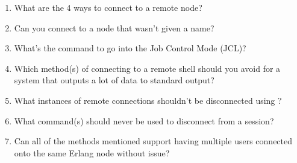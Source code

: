 \begin{enumerate}
	\item What are the 4 ways to connect to a remote node?
	\item Can you connect to a node that wasn't given a name?
	\item What's the command to go into the Job Control Mode (JCL)?
	\item Which method(s) of connecting to a remote shell should you avoid for a system that outputs a lot of data to standard output?
	\item What instances of remote connections shouldn't be disconnected using ?
	\item What command(s) should never be used to disconnect from a session?
	\item Can all of the methods mentioned support having multiple users connected onto the same Erlang node without issue?
\end{enumerate}

